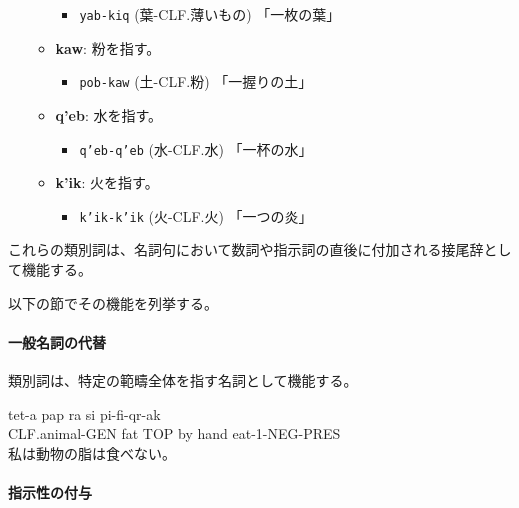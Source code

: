 \begin{itemize}
\begin{itemize}
                \begin{itemize}
                    \item \texttt{yab-kiq} (葉-CLF.薄いもの) %
                    \quad 「一枚の葉」
                \end{itemize}
            \item \textbf{kaw}: 粉を指す。
                \begin{itemize}
                    \item \texttt{pob-kaw} (土-CLF.粉) %
                    \quad 「一握りの土」
                \end{itemize}
            \item \textbf{q'eb}: 水を指す。%
                \begin{itemize}
                    \item \texttt{q'eb-q'eb} (水-CLF.水)
                    \quad 「一杯の水」
                \end{itemize}
            \item \textbf{k'ik}: 火を指す。%
                \begin{itemize}
                    \item \texttt{k'ik-k'ik} (火-CLF.火)
                    \quad 「一つの炎」
                \end{itemize}
        \end{itemize}
\end{itemize}
これらの類別詞は、名詞句において数詞や指示詞の直後に付加される接尾辞として機能する。

以下の節でその機能を列挙する。

\paragraph{一般名詞の代替}
類別詞は、特定の範疇全体を指す名詞として機能する。
\begin{exe}
\ex \gll tet-a pap ra si pi-fi-qr-ak\\
        CLF.animal-GEN fat TOP by hand eat-1-NEG-PRES\\
\glt 私は動物の脂は食べない。
\end{exe}

\paragraph{指示性の付与}

